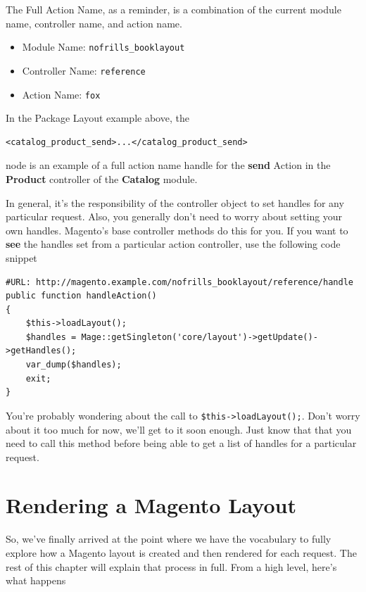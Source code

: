 \documentclass[oneside]{book}
\begin{document}
The Full Action Name, as a reminder, is a combination of the current module name, controller name, and action name.  

\begin{itemize}
\item Module Name: \footnotesize\texttt{nofrills\_booklayout} \normalsize 
\item Controller Name: \footnotesize\texttt{reference} \normalsize 
\item Action Name: \footnotesize\texttt{fox} \normalsize 
\end{itemize}


In the Package Layout example above, the

\begin{lstlisting}
<catalog_product_send>...</catalog_product_send>

\end{lstlisting}


node is an example of a full action name handle for the \textbf{send} Action in the \textbf{Product} controller of the \textbf{Catalog} module.

In general, it's the responsibility of the controller object to set handles for any particular request.  Also, you generally don't need to worry about setting your own handles.  Magento's base controller methods do this for you.  If you want to \textbf{see} the handles set from a particular action controller, use the following code snippet

\begin{lstlisting}
#URL: http://magento.example.com/nofrills_booklayout/reference/handle
public function handleAction()
{
    $this->loadLayout();
    $handles = Mage::getSingleton('core/layout')->getUpdate()->getHandles();
    var_dump($handles);
    exit;
}

\end{lstlisting}


You're probably wondering about the call to \footnotesize\texttt{\$this-\textgreater loadLayout();}\normalsize. Don't worry about it too much for now, we'll get to it soon enough.  Just know that that you need to call this method before being able to get a list of handles for a particular request. 

\section{Rendering a Magento Layout}

So, we've finally arrived at the point where we have the vocabulary to fully explore how a Magento layout is created and then rendered for each request.  The rest of this chapter will explain that process in full.  From a high level, here's what happens
\end{document}
